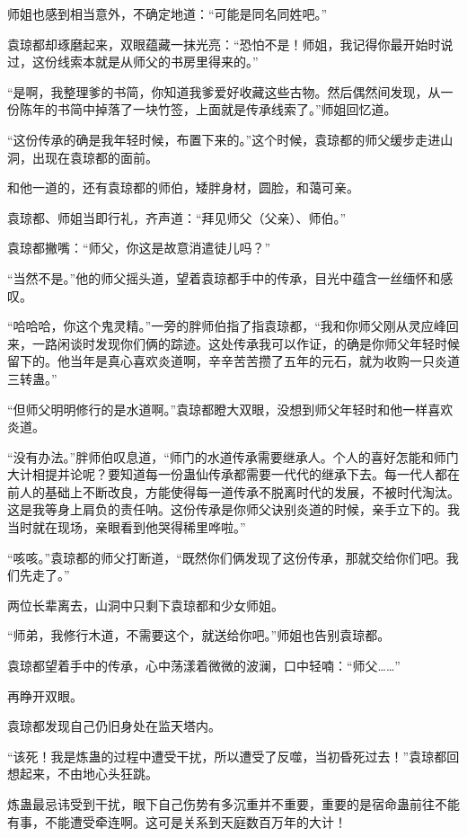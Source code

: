 \begin{this_body}
师姐也感到相当意外，不确定地道：“可能是同名同姓吧。”

袁琼都却琢磨起来，双眼蕴藏一抹光亮：“恐怕不是！师姐，我记得你最开始时说过，这份线索本就是从师父的书房里得来的。”

“是啊，我整理爹的书简，你知道我爹爱好收藏这些古物。然后偶然间发现，从一份陈年的书简中掉落了一块竹签，上面就是传承线索了。”师姐回忆道。

“这份传承的确是我年轻时候，布置下来的。”这个时候，袁琼都的师父缓步走进山洞，出现在袁琼都的面前。

和他一道的，还有袁琼都的师伯，矮胖身材，圆脸，和蔼可亲。

袁琼都、师姐当即行礼，齐声道：“拜见师父（父亲）、师伯。”

袁琼都撇嘴：“师父，你这是故意消遣徒儿吗？”

“当然不是。”他的师父摇头道，望着袁琼都手中的传承，目光中蕴含一丝缅怀和感叹。

“哈哈哈，你这个鬼灵精。”一旁的胖师伯指了指袁琼都，“我和你师父刚从灵应峰回来，一路闲谈时发现你们俩的踪迹。这处传承我可以作证，的确是你师父年轻时候留下的。他当年是真心喜欢炎道啊，辛辛苦苦攒了五年的元石，就为收购一只炎道三转蛊。”

“但师父明明修行的是水道啊。”袁琼都瞪大双眼，没想到师父年轻时和他一样喜欢炎道。

“没有办法。”胖师伯叹息道，“师门的水道传承需要继承人。个人的喜好怎能和师门大计相提并论呢？要知道每一份蛊仙传承都需要一代代的继承下去。每一代人都在前人的基础上不断改良，方能使得每一道传承不脱离时代的发展，不被时代淘汰。这是我等身上肩负的责任呐。这份传承是你师父诀别炎道的时候，亲手立下的。我当时就在现场，亲眼看到他哭得稀里哗啦。”

“咳咳。”袁琼都的师父打断道，“既然你们俩发现了这份传承，那就交给你们吧。我们先走了。”

两位长辈离去，山洞中只剩下袁琼都和少女师姐。

“师弟，我修行木道，不需要这个，就送给你吧。”师姐也告别袁琼都。

袁琼都望着手中的传承，心中荡漾着微微的波澜，口中轻喃：“师父……”

再睁开双眼。

袁琼都发现自己仍旧身处在监天塔内。

“该死！我是炼蛊的过程中遭受干扰，所以遭受了反噬，当初昏死过去！”袁琼都回想起来，不由地心头狂跳。

炼蛊最忌讳受到干扰，眼下自己伤势有多沉重并不重要，重要的是宿命蛊前往不能有事，不能遭受牵连啊。这可是关系到天庭数百万年的大计！


\end{this_body}

